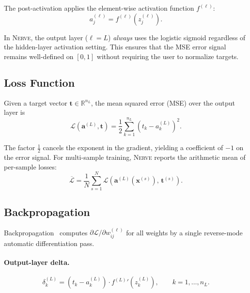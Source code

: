 \documentclass[11pt,a4paper]{article}
\newcommand{\nerve}{\textsc{Nerve}}
\newcommand{\R}{\mathbb{R}}
\begin{document}
The post-activation applies the element-wise activation function $f^{(\ell)}$:
\begin{equation}
  a_j^{(\ell)} = f^{(\ell)}\!\left(z_j^{(\ell)}\right).
  \label{eq:forward-post}
\end{equation}

In \nerve{}, the output layer ($\ell = L$) \emph{always} uses the logistic
sigmoid regardless of the hidden-layer activation setting. This ensures that
the MSE error signal remains well-defined on $[0,1]$ without requiring the
user to normalize targets.

\subsection{Loss Function}

Given a target vector $\mathbf{t} \in \R^{n_L}$, the mean squared error
(MSE) over the output layer is
\begin{equation}
  \mathcal{L}(\mathbf{a}^{(L)}, \mathbf{t})
    = \frac{1}{2}\sum_{k=1}^{n_L}\left(t_k - a_k^{(L)}\right)^2.
  \label{eq:loss}
\end{equation}

The factor $\tfrac{1}{2}$ cancels the exponent in the gradient, yielding a
coefficient of $-1$ on the error signal. For multi-sample training,
\nerve{} reports the arithmetic mean of per-sample losses:
\begin{equation}
  \overline{\mathcal{L}} = \frac{1}{N}\sum_{s=1}^{N}
    \mathcal{L}\!\left(\mathbf{a}^{(L)}(\mathbf{x}^{(s)}),\,\mathbf{t}^{(s)}\right).
\end{equation}

\subsection{Backpropagation}
\label{sec:backprop}

Backpropagation~\cite{rumelhart1986} computes $\partial\mathcal{L}/\partial
w_{ij}^{(\ell)}$ for all weights by a single reverse-mode automatic
differentiation pass.

\paragraph{Output-layer delta.}
\begin{equation}
  \delta_k^{(L)}
    = \left(t_k - a_k^{(L)}\right) \cdot {f^{(L)}}'\!\!\left(z_k^{(L)}\right),
  \qquad k = 1,\ldots,n_L.
  \label{eq:delta-output}
\end{equation}
\end{document}
